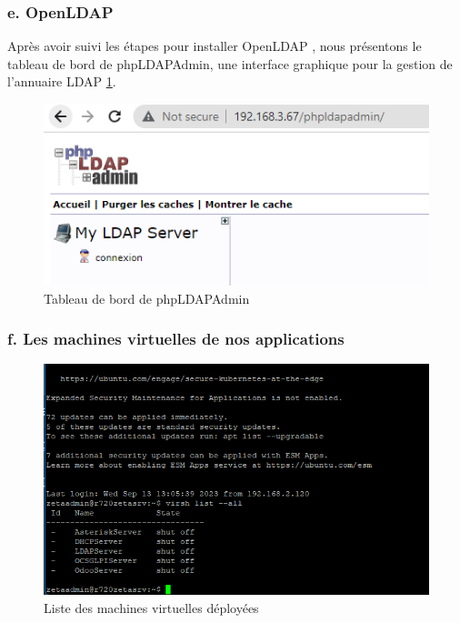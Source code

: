 \subsubsection{e. OpenLDAP}

Après avoir suivi les étapes pour installer OpenLDAP \cite{patil2020openldap}, nous présentons le tableau de bord de phpLDAPAdmin, une interface graphique pour la gestion de l'annuaire LDAP \ref{fig:ldap-dashboard}.

\begin{figure}[H]
\centering
\includegraphics[width=15cm]{Images/ldapdashboard.png}
\caption{Tableau de bord de phpLDAPAdmin}
\label{fig:ldap-dashboard}
\end{figure}

\subsubsection{f. Les machines virtuelles de nos applications}


\begin{figure}[H]
\centering
\includegraphics[width=15cm]{Images/virsh-listall.png}
\caption{Liste des machines virtuelles déployées}
\label{fig:vm-list}
\end{figure}

